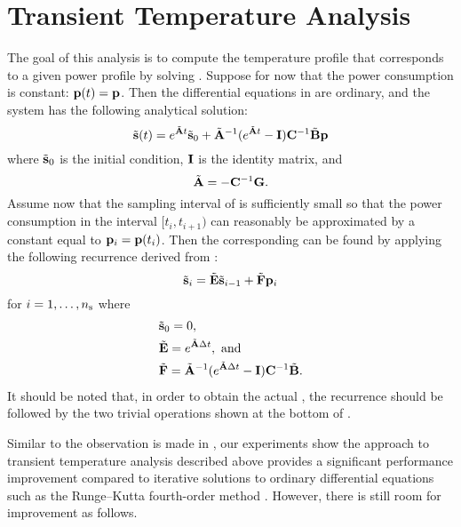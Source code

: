 \section{Transient Temperature Analysis}

The goal of this analysis is to compute the temperature profile \mq that
corresponds to a given power profile \mp by solving
. Suppose for now that the power consumption is
constant: $\mathbf{p}(t) = \mathbf{p}$. Then the differential equations in
 are ordinary, and the system has the following
analytical solution:
\begin{equation} \elab{solution-original}
  \tvs(t) = e^{\tm{A} t} \tvs_0 + \tm{A}^{-1} (e^{\tm{A} t} - \m{I}) \m{C}^{-1} \tm{B} \vp
\end{equation}
where $\tilde{\mathbf{s}}_0$ is the initial condition, $\mathbf{I}$ is the identity matrix, and
\[
  \tilde{\mathbf{A}} = -\mathbf{C}^{-1} \mathbf{G}.
\]
Assume now that the sampling interval \dt of \mp is sufficiently small so that
the power consumption in the interval $[t_i, t_{i + 1})$ can reasonably be
approximated by a constant equal to $\mathbf{p}_i = \mathbf{p}(t_i)$. Then the corresponding
\mq can be found by applying the following recurrence derived from
:
\begin{equation} \elab{recurrence-original}
  \tvs_{i} = \tm{E} \tvs_{i - 1} + \tm{F} \vp_i
\end{equation}
for $i = 1, \dots, {n_\mathrm{s}}$ where
\begin{align*}
  & \tilde{\mathbf{s}}_0 = 0, \\
  & \tilde{\mathbf{E}} = e^{\tilde{\mathbf{A}} \Delta t}, \text{ and} \\
  & \tilde{\mathbf{F}} = \tilde{\mathbf{A}}^{-1}(e^{\tilde{\mathbf{A}} \Delta t} - \mathbf{I})\mathbf{C}^{-1} \tilde{\mathbf{B}}.
\end{align*}
It should be noted that, in order to obtain the actual \mq, the recurrence
should be followed by the two trivial operations shown at the bottom of
.

Similar to the observation is made in \cite{thiele2011}, our experiments show
the approach to transient temperature analysis described above provides a
significant performance improvement compared to iterative solutions to ordinary
differential equations such as the Runge--Kutta fourth-order method
\cite{press2007}. However, there is still room for improvement as follows.

